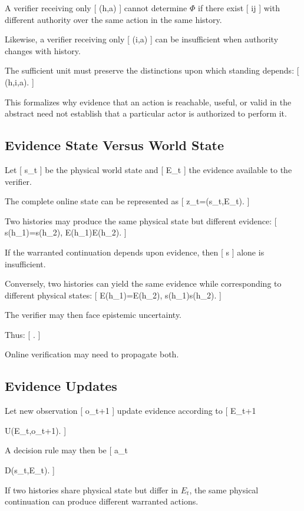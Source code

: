 \documentclass[11pt]{article}
\begin{document}
A verifier receiving only
[
(h,a)
]
cannot determine $\Phi$ if there exist
[
i\neq j
]
with different authority over the same action in the same history.

Likewise, a verifier receiving only
[
(i,a)
]
can be insufficient when authority changes with history.

The sufficient unit must preserve the distinctions upon which standing depends:
[
\pi(h,i,a).
]

This formalizes why evidence that an action is reachable, useful, or valid in the abstract need not establish that a particular actor is authorized to perform it.

\subsection{Evidence State Versus World State}

Let
[
s_t
]
be the physical world state and
[
E_t
]
the evidence available to the verifier.

The complete online state can be represented as
[
z_t=(s_t,E_t).
]

Two histories may produce the same physical state but different evidence:
[
s(h_1)=s(h_2),
\qquad
E(h_1)\neq E(h_2).
]

If the warranted continuation depends upon evidence, then
[
s
]
alone is insufficient.

Conversely, two histories can yield the same evidence while corresponding to different physical states:
[
E(h_1)=E(h_2),
\qquad
s(h_1)\neq s(h_2).
]

The verifier may then face epistemic uncertainty.

Thus:
[
\neq
{}.
]

Online verification may need to propagate both.

\subsection{Evidence Updates}

Let new observation
[
o_{t+1}
]
update evidence according to
[
E_{t+1}

U(E_t,o_{t+1}).
]

A decision rule may then be
[
a_t

D(s_t,E_t).
]

If two histories share physical state but differ in $E_t$, the same physical continuation can produce different warranted actions.
\end{document}
